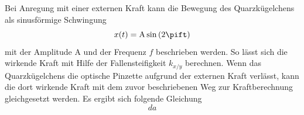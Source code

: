             
            Bei Anregung mit einer externen Kraft kann die Bewegung des Quarzkügelchens als sinusförmige Schwingung
            \begin{equation*}
                x(t) = \text{A} \sin\left(2\pift\right)
            \end{equation*}
            mit der Amplitude A und der Frequenz $f$ beschrieben werden. So lässt sich die wirkende Kraft mit Hilfe der Fallensteifigkeit $k_{x/y}$ berechnen. Wenn das Quarzkügelchens die optische Pinzette 
            aufgrund der externen Kraft verlässt, kann die dort wirkende Kraft mit dem zuvor beschriebenen Weg zur Kraftberechnung gleichgesetzt werden. Es ergibt sich folgende Gleichung
            \begin{equation*}
                da
            \end{equation*} 
            



    \newpage
